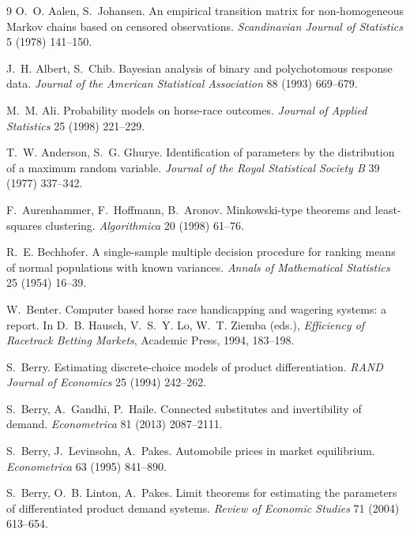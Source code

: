 \documentclass[12pt]{article}
\theoremstyle{remark}
\begin{document}
\begin{thebibliography}{9}
 O.~O. Aalen, S.~Johansen.
An empirical transition matrix for non-homogeneous Markov chains based on
censored observations. \emph{Scandinavian Journal of Statistics} 5
(1978) 141--150.

 J.~H. Albert, S.~Chib.
Bayesian analysis of binary and polychotomous response data.
\emph{Journal of the American Statistical Association} 88 (1993)
669--679.

 M.~M. Ali. Probability models on horse-race
outcomes. \emph{Journal of Applied Statistics} 25 (1998) 221--229.

 T.~W. Anderson,
S.~G. Ghurye. Identification of parameters by the distribution of a
maximum random variable. \emph{Journal of the Royal Statistical Society
B} 39 (1977) 337--342.

 F.~Aurenhammer, F.~Hoffmann, B.~Aronov.
Minkowski-type theorems and least-squares clustering.
\emph{Algorithmica} 20 (1998) 61--76.

 R.~E. Bechhofer. A single-sample
multiple decision procedure for ranking means of normal populations with
known variances. \emph{Annals of Mathematical Statistics} 25 (1954)
16--39.

 W.~Benter. Computer based horse
race handicapping and wagering systems: a report. In D.~B. Hausch,
V.~S.~Y. Lo, W.~T. Ziemba (eds.), \emph{Efficiency of Racetrack
Betting Markets}, Academic Press, 1994, 183--198.

 S.~Berry. Estimating discrete-choice
models of product differentiation. \emph{RAND Journal of Economics} 25
(1994) 242--262.

 S.~Berry, A.~Gandhi, P.~Haile. Connected substitutes
and invertibility of demand. \emph{Econometrica} 81 (2013) 2087--2111.

 S.~Berry, J.~Levinsohn, A.~Pakes. Automobile prices in
market equilibrium. \emph{Econometrica} 63 (1995) 841--890.

 S.~Berry,
O.~B. Linton, A.~Pakes. Limit theorems for estimating the parameters of
differentiated product demand systems. \emph{Review of Economic
Studies} 71 (2004) 613--654.


\end{thebibliography}
\end{document}
